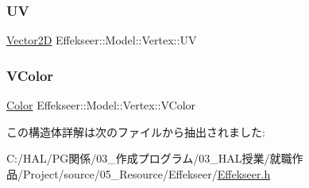 \mbox{\label{struct_effekseer_1_1_model_1_1_vertex_a4b16f6ed12f2a67a6064728c7fe37d7f}} 
\subsubsection{\texorpdfstring{UV}{UV}}
{\footnotesize\ttfamily \mbox{\hyperlink{struct_effekseer_1_1_vector2_d}{Vector2D}} Effekseer\+::\+Model\+::\+Vertex\+::\+UV}

\mbox{\label{struct_effekseer_1_1_model_1_1_vertex_a41a843c2f7d16433de79a01837a91a7f}} 
\subsubsection{\texorpdfstring{V\+Color}{VColor}}
{\footnotesize\ttfamily \mbox{\hyperlink{struct_effekseer_1_1_color}{Color}} Effekseer\+::\+Model\+::\+Vertex\+::\+V\+Color}



この構造体詳解は次のファイルから抽出されました\+:\begin{DoxyCompactItemize}
\item 
C\+:/\+H\+A\+L/\+P\+G関係/03\+\_\+作成プログラム/03\+\_\+\+H\+A\+L授業/就職作品/\+Project/source/05\+\_\+\+Resource/\+Effekseer/\mbox{\hyperlink{_effekseer_8h}{Effekseer.\+h}}\end{DoxyCompactItemize}
